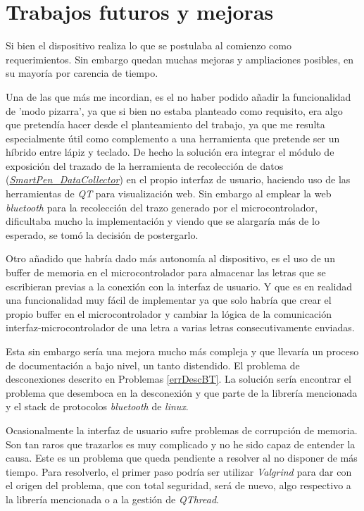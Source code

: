 \chapter{Trabajos futuros y mejoras}
Si bien el dispositivo realiza lo que se postulaba al comienzo
como requerimientos. Sin embargo quedan muchas mejoras y ampliaciones
posibles, en su mayoría por carencia de tiempo.

Una de las que más me incordian, es el no haber podido añadir
la funcionalidad de 'modo pizarra', ya que si bien no estaba planteado
como requisito, era algo que pretendía hacer desde el planteamiento del
trabajo, ya que me resulta especialmente útil como complemento a una
herramienta que pretende ser un híbrido entre lápiz y teclado.
De hecho la solución era integrar el módulo de exposición del trazado
de la herramienta de recolección de datos
(\href{https://github.com/AntonioPriego/SmartPen/blob/main/DataCollector/SmartPen_DataCollector.html}{\textit{SmartPen\_DataCollector}})
en el propio interfaz de usuario, haciendo uso de las herramientas de \textit{QT}
para visualización web. Sin embargo al emplear la web \textit{bluetooth}
para la recolección del trazo generado por el microcontrolador, dificultaba
mucho la implementación y viendo que se alargaría más de lo esperado,
se tomó la decisión de postergarlo.

Otro añadido que habría dado más autonomía al dispositivo, es el uso
de un buffer de memoria en el microcontrolador para almacenar
las letras que se escribieran previas a la conexión con la interfaz
de usuario. Y que es en realidad una funcionalidad muy fácil de implementar
ya que solo habría que crear el propio buffer en el microcontrolador
y cambiar la lógica de la comunicación interfaz-microcontrolador de una
letra a varias letras consecutivamente enviadas.

Esta sin embargo sería una mejora mucho más compleja y que llevaría
un proceso de documentación a bajo nivel, un tanto distendido.
El problema de desconexiones descrito en Problemas \ref{errDescBT}.
La solución sería encontrar el problema que desemboca en la desconexión
y que parte de la librería mencionada y el stack de protocolos \textit{bluetooth}
de \textit{linux}.

Ocasionalmente la interfaz de usuario sufre problemas de corrupción de memoria.
Son tan raros que trazarlos es muy complicado y no he sido capaz de entender la
causa. Este es un problema que queda pendiente a resolver al no disponer de más
tiempo.
Para resolverlo, el primer paso podría ser utilizar \textit{Valgrind}
para dar con el origen del problema, que con total seguridad, será de nuevo,
algo respectivo a la librería mencionada o a la gestión de \textit{QThread}.

